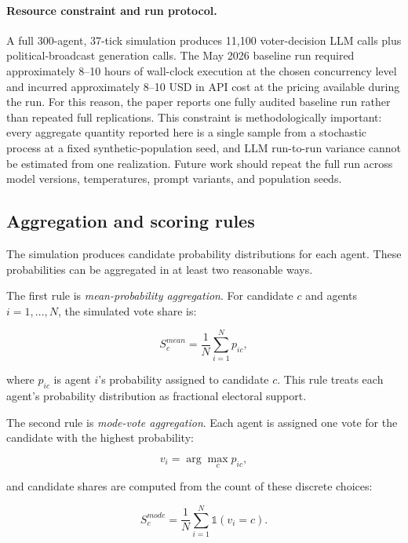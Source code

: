 \documentclass[pdflatex,sn-mathphys-num,iicol]{sn-jnl}
\begin{document}
\paragraph{Resource constraint and run protocol.}
A full 300-agent, 37-tick simulation produces 11{,}100 voter-decision LLM calls plus political-broadcast generation calls. The May 2026 baseline run required approximately 8--10 hours of wall-clock execution at the chosen concurrency level and incurred approximately 8--10 USD in API cost at the pricing available during the run. For this reason, the paper reports one fully audited baseline run rather than repeated full replications. This constraint is methodologically important: every aggregate quantity reported here is a single sample from a stochastic process at a fixed synthetic-population seed, and LLM run-to-run variance cannot be estimated from one realization. Future work should repeat the full run across model versions, temperatures, prompt variants, and population seeds.

\subsection{Aggregation and scoring rules}\label{subsec:scoring}

The simulation produces candidate probability distributions for each agent. These probabilities can be aggregated in at least two reasonable ways.

The first rule is \textit{mean-probability aggregation}. For candidate $c$ and agents $i=1,\ldots,N$, the simulated vote share is:

\begin{equation}
S_c^{mean} = \frac{1}{N}\sum_{i=1}^{N}p_{ic},
\end{equation}

where $p_{ic}$ is agent $i$'s probability assigned to candidate $c$. This rule treats each agent's probability distribution as fractional electoral support.

The second rule is \textit{mode-vote aggregation}. Each agent is assigned one vote for the candidate with the highest probability:

\begin{equation}
v_i = \arg\max_c p_{ic},
\end{equation}

and candidate shares are computed from the count of these discrete choices:

\begin{equation}
S_c^{mode} = \frac{1}{N}\sum_{i=1}^{N}\mathbb{1}(v_i=c).
\end{equation}
\end{document}
